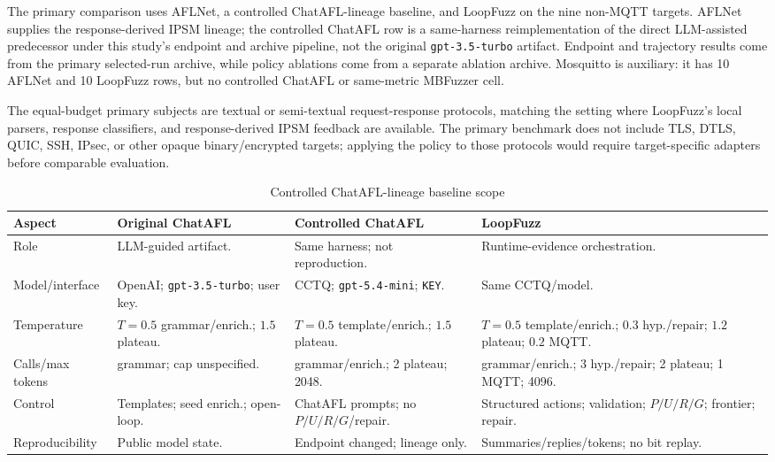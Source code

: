 \documentclass[final,5p,times,number]{elsarticle}
\begin{document}
The primary comparison uses AFLNet, a controlled ChatAFL-lineage baseline, and LoopFuzz on the nine non-MQTT targets. AFLNet supplies the response-derived IPSM lineage; the controlled ChatAFL row is a same-harness reimplementation of the direct LLM-assisted predecessor under this study's endpoint and archive pipeline, not the original \texttt{gpt-3.5-turbo} artifact. Endpoint and trajectory results come from the primary selected-run archive, while policy ablations come from a separate ablation archive. Mosquitto is auxiliary: it has 10 AFLNet and 10 LoopFuzz rows, but no controlled ChatAFL or same-metric MBFuzzer cell.

The equal-budget primary subjects are textual or semi-textual request-response protocols, matching the setting where LoopFuzz's local parsers, response classifiers, and response-derived IPSM feedback are available. The primary benchmark does not include TLS, DTLS, QUIC, SSH, IPsec, or other opaque binary/encrypted targets; applying the policy to those protocols would require target-specific adapters before comparable evaluation.

\begin{table}[!t]
\centering
\caption{Controlled ChatAFL-lineage baseline scope}
\label{tab:chatafl_config_scope}
{\scriptsize
\setlength{\tabcolsep}{3.0pt}
\renewcommand{\arraystretch}{1.12}
\begin{tabularx}{\textwidth}{>{\raggedright\arraybackslash}p{}
>{\raggedright\arraybackslash}X
>{\raggedright\arraybackslash}X
>{\raggedright\arraybackslash}X}
\toprule
Aspect & Original ChatAFL & Controlled ChatAFL & LoopFuzz \\
\midrule
Role &
LLM-guided artifact. &
Same harness; not reproduction. &
Runtime-evidence orchestration. \\
Model/interface &
OpenAI; \texttt{gpt-3.5-turbo}; user key. &
CCTQ; \texttt{gpt-5.4-mini}; \texttt{KEY}. &
Same CCTQ/model. \\
Temperature &
$T{=}0.5$ grammar/enrich.; $1.5$ plateau. &
$T{=}0.5$ template/enrich.; $1.5$ plateau. &
$T{=}0.5$ template/enrich.; $0.3$ hyp./repair; $1.2$ plateau; $0.2$ MQTT. \\
Calls/max tokens &
5 grammar; cap unspecified. &
5 grammar/enrich.; 2 plateau; 2048. &
5 grammar/enrich.; 3 hyp./repair; 2 plateau; 1 MQTT; 4096. \\
Control &
Templates; seed enrich.; open-loop. &
ChatAFL prompts; no $P/U/R/G$/repair. &
Structured actions; validation; $P/U/R/G$; frontier; repair. \\
Reproducibility &
Public model state. &
Endpoint changed; lineage only. &
Summaries/replies/tokens; no bit replay. \\
\bottomrule
\end{tabularx}
}
\end{table}
\end{document}
